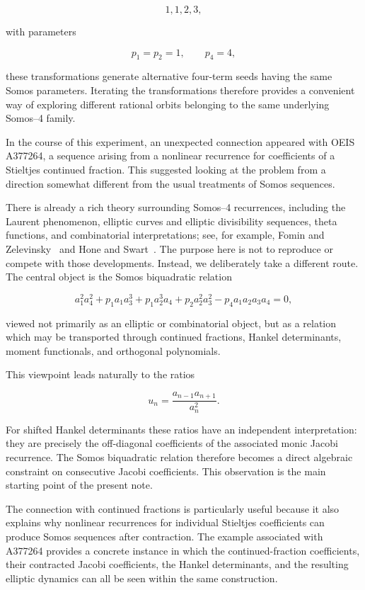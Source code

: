 \documentclass[11pt]{article}
\theoremstyle{remark}
\begin{document}
$$
1,1,2,3,
$$

with parameters

$$
p_1=p_2=1,\qquad p_4=4,
$$

these transformations generate alternative four-term seeds having the same Somos parameters. Iterating the transformations therefore provides a convenient way of exploring different rational orbits belonging to the same underlying Somos--4 family.

In the course of this experiment, an unexpected connection appeared with OEIS A377264, a sequence arising from a nonlinear recurrence for coefficients of a Stieltjes continued fraction. This suggested looking at the problem from a direction somewhat different from the usual treatments of Somos sequences.

There is already a rich theory surrounding Somos--4 recurrences, including the Laurent phenomenon, elliptic curves and elliptic divisibility sequences, theta functions, and combinatorial interpretations; see, for example, Fomin and Zelevinsky~\cite{FominZelevinsky2002} and Hone and Swart~\cite{HoneSwart2008}. The purpose here is not to reproduce or compete with those developments. Instead, we deliberately take a different route. The central object is the Somos biquadratic relation

$$
a_1^2a_4^2
+p_1a_1a_3^3
+p_1a_2^3a_4
+p_2a_2^2a_3^2
-p_4a_1a_2a_3a_4=0,
$$

viewed not primarily as an elliptic or combinatorial object, but as a relation which may be transported through continued fractions, Hankel determinants, moment functionals, and orthogonal polynomials.

This viewpoint leads naturally to the ratios

$$
u_n=\frac{a_{n-1}a_{n+1}}{a_n^2}.
$$

For shifted Hankel determinants these ratios have an independent interpretation: they are precisely the off-diagonal coefficients of the associated monic Jacobi recurrence. The Somos biquadratic relation therefore becomes a direct algebraic constraint on consecutive Jacobi coefficients. This observation is the main starting point of the present note.

The connection with continued fractions is particularly useful because it also explains why nonlinear recurrences for individual Stieltjes coefficients can produce Somos sequences after contraction. The example associated with A377264 provides a concrete instance in which the continued-fraction coefficients, their contracted Jacobi coefficients, the Hankel determinants, and the resulting elliptic dynamics can all be seen within the same construction.
\end{document}
